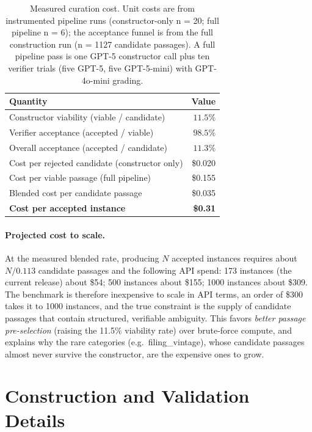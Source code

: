 \begin{table}[!htbp]
\centering
\caption{Measured curation cost. Unit costs are from instrumented pipeline runs
(constructor-only n = 20; full pipeline n = 6); the acceptance funnel is from
the full construction run (n = 1127 candidate passages). A full pipeline pass
is one GPT-5 constructor call plus ten verifier trials (five GPT-5, five
GPT-5-mini) with GPT-4o-mini grading.}
\label{tab:cost}
\small
\begin{tabular}{lr}
\toprule
Quantity & Value \\
\midrule
Constructor viability (viable / candidate)      & $11.5\%$ \\
Verifier acceptance (accepted / viable)         & $98.5\%$ \\
Overall acceptance (accepted / candidate)       & $11.3\%$ \\
\midrule
Cost per rejected candidate (constructor only)  & \$0.020 \\
Cost per viable passage (full pipeline)         & \$0.155 \\
Blended cost per candidate passage              & \$0.035 \\
\textbf{Cost per accepted instance}             & \textbf{\$0.31} \\
\bottomrule
\end{tabular}
\end{table}

\paragraph{Projected cost to scale.} At the measured blended rate, producing $N$
accepted instances requires about $N/0.113$ candidate passages and the
following API spend: 173 instances (the current release) about \$54;
500 instances about \$155; 1000 instances about \$309. The
benchmark is therefore inexpensive to scale in API terms, an order of
\$300 takes it to 1000 instances, and the true constraint is the supply of
candidate passages that contain structured, verifiable ambiguity. This favors
\emph{better passage pre-selection} (raising the 11.5\% viability rate) over
brute-force compute, and explains why the rare categories (e.g.\ filing\_vintage),
whose candidate passages almost never survive the constructor, are the expensive
ones to grow.

\section{Construction and Validation Details}
\label{app:construction}

